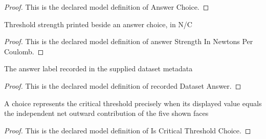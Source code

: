 \begin{proof}
  This is the declared model definition of Answer Choice.
\end{proof}
\begin{definition}
  \label{def:physics:phyx-mini-0842:phyxminiproblems-problemphyxmini0842-answerstrengthinnewtonspercoulomb}
  Threshold strength printed beside an answer choice, in N/C
\end{definition}
\begin{proof}
  This is the declared model definition of answer Strength In Newtons Per Coulomb.
\end{proof}
\begin{definition}
  \label{def:physics:phyx-mini-0842:phyxminiproblems-problemphyxmini0842-recordeddatasetanswer}
  The answer label recorded in the supplied dataset metadata
\end{definition}
\begin{proof}
  This is the declared model definition of recorded Dataset Answer.
\end{proof}
\begin{definition}
  \label{def:physics:phyx-mini-0842:phyxminiproblems-problemphyxmini0842-iscriticalthresholdchoice}
  A choice represents the critical threshold precisely when its displayed value equals the independent net outward contribution of the five shown faces
\end{definition}
\begin{proof}
  This is the declared model definition of Is Critical Threshold Choice.
\end{proof}
